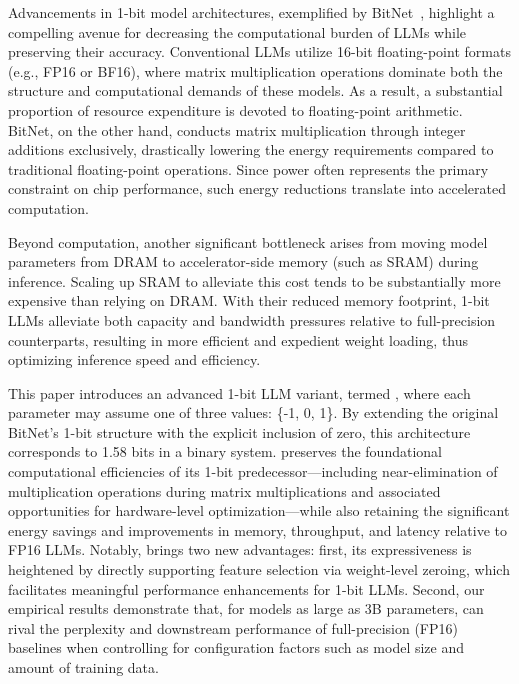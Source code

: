 Advancements in 1-bit model architectures, exemplified by BitNet~\cite{bitnet}, highlight a compelling avenue for decreasing the computational burden of LLMs while preserving their accuracy. Conventional LLMs utilize 16-bit floating-point formats (e.g., FP16 or BF16), where matrix multiplication operations dominate both the structure and computational demands of these models. As a result, a substantial proportion of resource expenditure is devoted to floating-point arithmetic. BitNet, on the other hand, conducts matrix multiplication through integer additions exclusively, drastically lowering the energy requirements compared to traditional floating-point operations. Since power often represents the primary constraint on chip performance, such energy reductions translate into accelerated computation.

Beyond computation, another significant bottleneck arises from moving model parameters from DRAM to accelerator-side memory (such as SRAM) during inference. Scaling up SRAM to alleviate this cost tends to be substantially more expensive than relying on DRAM. With their reduced memory footprint, 1-bit LLMs alleviate both capacity and bandwidth pressures relative to full-precision counterparts, resulting in more efficient and expedient weight loading, thus optimizing inference speed and efficiency.

This paper introduces an advanced 1-bit LLM variant, termed \textbf{}, where each parameter may assume one of three values: \{-1, 0, 1\}. By extending the original BitNet's 1-bit structure with the explicit inclusion of zero, this architecture corresponds to 1.58 bits in a binary system.  preserves the foundational computational efficiencies of its 1-bit predecessor—including near-elimination of multiplication operations during matrix multiplications and associated opportunities for hardware-level optimization—while also retaining the significant energy savings and improvements in memory, throughput, and latency relative to FP16 LLMs. Notably,  brings two new advantages: first, its expressiveness is heightened by directly supporting feature selection via weight-level zeroing, which facilitates meaningful performance enhancements for 1-bit LLMs. Second, our empirical results demonstrate that, for models as large as 3B parameters,  can rival the perplexity and downstream performance of full-precision (FP16) baselines when controlling for configuration factors such as model size and amount of training data.

